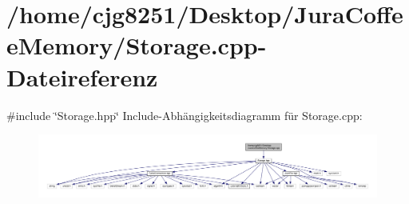 \section{/home/cjg8251/\+Desktop/\+Jura\+Coffee\+Memory/\+Storage.cpp-\/\+Dateireferenz}
\label{_storage_8cpp}
{\ttfamily \#include \char`\"{}Storage.\+hpp\char`\"{}}\newline
Include-\/\+Abhängigkeitsdiagramm für Storage.\+cpp\+:
\nopagebreak
\begin{figure}[H]
\begin{center}
\leavevmode
\includegraphics[width=350pt]{_storage_8cpp__incl}
\end{center}
\end{figure}
